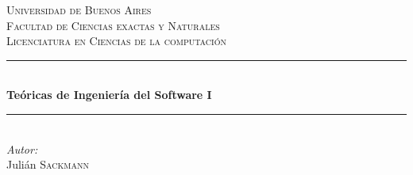 \documentclass[]{article}
\begin{document}
\begin{titlepage}

\newcommand{\HRule}{\rule{\linewidth}{0.5mm}} %

\center %


\textsc{\LARGE Universidad de Buenos Aires}\\[1.5cm] %
\textsc{\Large Facultad de Ciencias exactas y Naturales}\\[0.5cm] %
\textsc{\large Licenciatura en Ciencias de la computación}\\[0.5cm] %


\HRule \\[0.4cm]
{ \huge \bfseries Teóricas de Ingeniería del Software I}\\[0.4cm] %
\HRule \\[1.5cm]

%

\Large \emph{Autor:}\\
Julián \textsc{Sackmann}\\[2cm] %


\end{titlepage}
\end{document}
